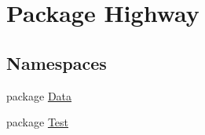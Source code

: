 \hypertarget{namespace_highway}{\section{Package Highway}
\label{namespace_highway}
}
\subsection*{Namespaces}
\begin{DoxyCompactItemize}
\item 
package \hyperlink{namespace_highway_1_1_data}{Data}
\item 
package \hyperlink{namespace_highway_1_1_test}{Test}
\end{DoxyCompactItemize}
